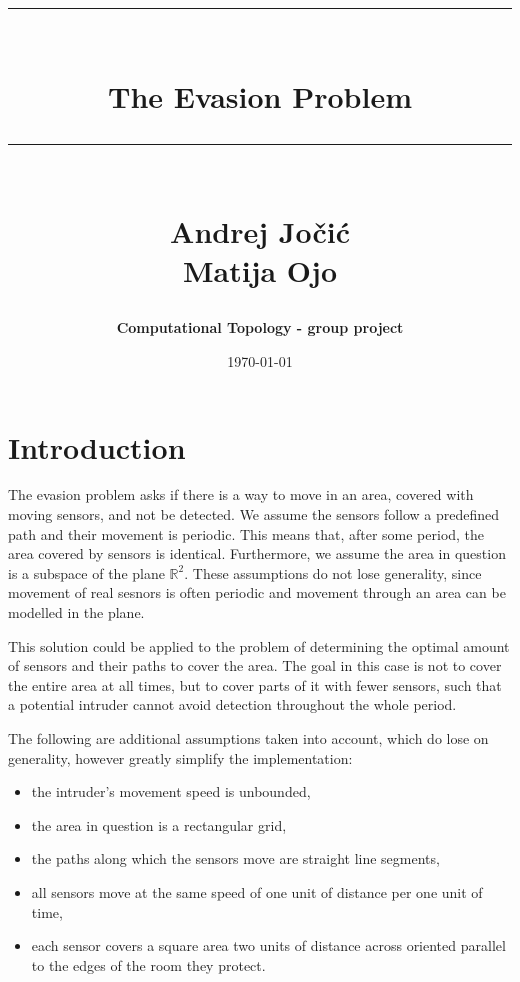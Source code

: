 \documentclass{article}
\makeatletter
\newcommand{\HRule}[1]{\rule{\linewidth}{#1}}
\renewcommand{\maketitle}{%
  \begin{center}
    \vspace*{3cm} %
    {\LARGE\@author\par}
    \vspace{1cm} %
    {\Huge\bfseries\@title\par}
    \vspace{2cm} %
    {\Large\@date\par}
  \end{center}
}
\makeatother
\begin{document}
\title{ \normalsize \textsc{}
\\ [0.5cm]
\HRule{1.0pt} \\
\Huge \textbf{The Evasion Problem}
\HRule{1.0pt}
\\ [1.5cm]
\LARGE{Andrej Jočić \\ Matija Ojo}
}
\author{\textbf{Computational Topology - group project}}
\date{\today}

\maketitle

\newpage


\section{Introduction}

The evasion problem asks if there is a way to move in an area, covered with moving sensors, and not be detected.
We assume the sensors follow a predefined path and their movement is periodic.
This means that, after some period, the area covered by sensors is identical.
Furthermore, we assume the area in question is a subspace of the plane $ \mathbb{R}^2 $.
These assumptions do not lose generality, since movement of real sesnors is often periodic and movement through an area can be modelled in the plane.

This solution could be applied to the problem of determining the optimal amount of sensors and their paths to cover the area.
The goal in this case is not to cover the entire area at all times, but to cover parts of it with fewer sensors, such that a potential intruder cannot avoid detection throughout the whole period.

The following are additional assumptions taken into account, which do lose on generality, however greatly simplify the implementation:
\begin{itemize}
  \item the intruder's movement speed is unbounded,
  \item the area in question is a rectangular grid,
  \item the paths along which the sensors move are straight line segments,
  \item all sensors move at the same speed of one unit of distance per one unit of time,
  \item each sensor covers a square area two units of distance across oriented parallel to the edges of the room they protect.
\end{itemize}
\end{document}
